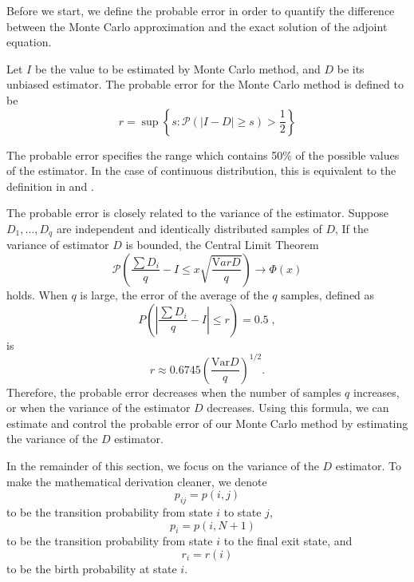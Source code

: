     Before we start, we define the probable error in order to quantify
    the difference between the Monte Carlo approximation and the exact solution
    of the adjoint equation.
    \begin{definition}
        Let $I$ be the value to be estimated by Monte Carlo method,
        and $D$ be its unbiased estimator. The probable error for the Monte
        Carlo method is defined to be
        \begin{equation}
            r = \sup \left\{ s : \mathcal{P}\left( |I-D| \ge s \right)
                             > \frac12 \right\}
        \end{equation}
    \end{definition}
    The probable error specifies the range which contains 50\% of the possible
    values of the estimator. In the case of continuous distribution, this
    is equivalent to the definition in \cite[]{Tan2001} and \cite[]{Sobol1973}.

    The probable error is closely related to the variance of the estimator.
    Suppose $D_1, \ldots, D_q$ are independent and identically distributed
    samples of $D$, If the variance of estimator $D$ is bounded, the Central
    Limit Theorem
    \[ \mathcal{P} \left( \frac{\sum D_i}q - I \le x
       \sqrt{\frac{{\mathrm Var} D}{q}} \right) \to \Phi(x)
    \]
    holds. When $q$ is large, the error of the average of the $q$
    samples, defined as
    \[ P\left( \left| \frac{\sum D_i}q - I \right| \le r \right) = 0.5\;, \]
    is \cite[]{Tan2002} \cite[]{Tan2001}
    \begin{equation} \label{proberr}
        r \approx 0.6745 \left( \frac{\text{Var} D }{q} \right)^{1/2} .
    \end{equation}
    Therefore, the probable error decreases when the number of samples $q$
    increases, or when the variance of the estimator $D$ decreases.  Using
    this formula, we can estimate and control the probable error of our
    Monte Carlo method by estimating the variance of the $D$ estimator.
    
    In the remainder of this section,
    we focus on the variance of the $D$ estimator.
    To make the mathematical derivation cleaner, we denote \[ p_{ij} = p(i,j)\]
    to be the transition probability from state $i$ to state $j$,
    \[\quad p_i = p(i,N+1)
    \]
    to be the transition probability from state $i$ to the final exit state,
    and \[r_i = r(i)\] to be the birth probability at state $i$.
    


